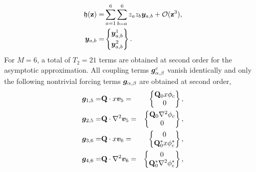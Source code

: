 \begin{align}
	\label{eqn:GL_asymptotic}
		\mathfrak{h}(\mathbf{z}) =& \sum_{a=1}^{6}\sum_{b=a}^{6} z_{a}z_{b}\vfield{y}_{a,b}
		 + \mathcal{O}(\mathbf{z}^{3}), \nonumber \\
		 \vfield{y}_{a,b} =& \begin{Bmatrix}
		 	\vfield{y}^{1}_{a,b} \vspace{1mm} \\
		 	\vfield{y}^{2}_{a,b}
		 \end{Bmatrix}.	\nonumber
\end{align}
For $M=6$, a total of $T_{2}=21$ terms are obtained at second order for the asymptotic approximation. All coupling terms $\boldsymbol{g}^{c}_{\alpha,\beta}$ vanish identically and only the following nontrivial forcing terms $\boldsymbol{g}_{\alpha,\beta}$ are obtained at second order,
\begin{align}
	\boldsymbol{g}_{1,5} =& 	\mathbf{Q}\cdot x\boldsymbol{v}_{5} =&
	\begin{Bmatrix}
		\mathbf{Q}_{0}x\phi_{c} \\
		0
	\end{Bmatrix}, \nonumber \\
	\boldsymbol{g}_{2,5} =& 	\mathbf{Q}\cdot \nabla^{2}\boldsymbol{v}_{5} =&
	\begin{Bmatrix}
		\mathbf{Q}_{0}\nabla^{2}\phi_{c}	\\
		0
	\end{Bmatrix}, \nonumber \\
	\boldsymbol{g}_{3,6} =& 	\mathbf{Q}\cdot x\boldsymbol{v}_{6} =&
	\begin{Bmatrix}
		0	\\
		\mathbf{Q}^{*}_{0}x\phi^{*}_{c}
	\end{Bmatrix}, \nonumber \\
	\boldsymbol{g}_{4,6} =& 	\mathbf{Q}\cdot \nabla^{2}\boldsymbol{v}_{6} =&
	\begin{Bmatrix}
		0	\\
		\mathbf{Q}^{*}_{0}\nabla^{2}\phi^{*}_{c}
	\end{Bmatrix}, \nonumber
\end{align}
